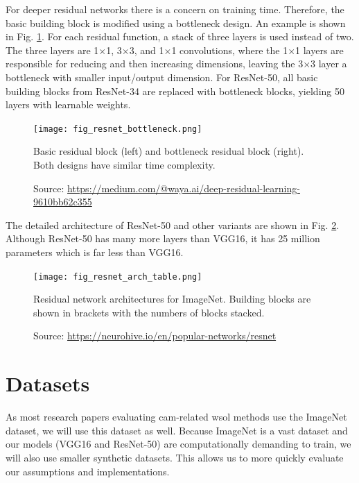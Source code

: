 For deeper residual networks there is a concern on training time. Therefore, the basic building block is modified using a bottleneck design. An example is shown in Fig. \ref{fig:resnet_bottleneck}. For each residual function, a stack of three layers is used instead of two. The three layers are 1$\times$1, 3$\times$3, and 1$\times$1 convolutions, where the 1$\times$1 layers are responsible for reducing and then increasing dimensions, leaving the 3$\times$3 layer a bottleneck with smaller input/output dimension. For ResNet-50, all basic building blocks from ResNet-34 are replaced with bottleneck blocks, yielding 50 layers with learnable weights.
\begin{figure}[ht]
    \begin{center}       
    \texttt{[image: fig\_resnet\_bottleneck.png]}
    \caption[Residual basic and bottleneck blocks]{Basic residual block (left) and bottleneck residual block (right). Both designs have similar time complexity.}
    \caption*{Source: \href{https://medium.com/@waya.ai/deep-residual-learning-9610bb62c355}{https://medium.com/@waya.ai/deep-residual-learning-9610bb62c355}}
    \label{fig:resnet_bottleneck}
    \end{center}
\end{figure}

The detailed architecture of ResNet-50 and other variants are shown in Fig. \ref{fig:resnet_arch_table}. Although ResNet-50 has many more layers than VGG16, it has 25 million parameters which is far less than VGG16. 
\begin{figure}[ht]
    \begin{center}       
    \texttt{[image: fig\_resnet\_arch\_table.png]}
    \caption[Residual network architectures]{Residual network architectures for ImageNet. Building blocks are shown in brackets with the numbers of blocks stacked.}
    \caption*{Source: \href{https://neurohive.io/en/popular-networks/resnet}{https://neurohive.io/en/popular-networks/resnet}}
    \label{fig:resnet_arch_table}
    \end{center}
\end{figure}

\section{Datasets}
As most research papers evaluating \acrshort{cam}-related \acrshort{wsol} methods use the ImageNet dataset, we will use this dataset as well. Because ImageNet is a vast dataset and our models (VGG16 and ResNet-50) are computationally demanding to train, we will also use smaller synthetic datasets. This allows us to more quickly evaluate our assumptions and implementations.

